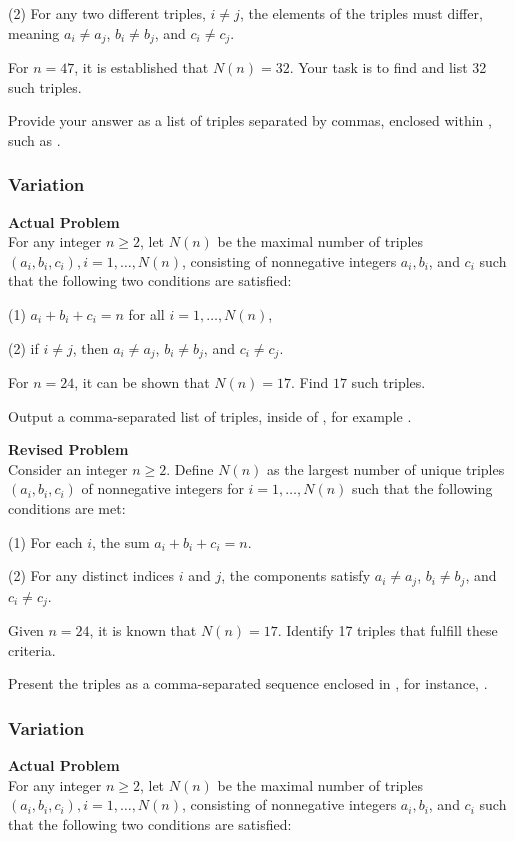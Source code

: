 (2) For any two different triples, \( i \neq j \), the elements of the triples must differ, meaning \( a_i \neq a_j \), \( b_i \neq b_j \), and \( c_i \neq c_j \).

For \( n = 47 \), it is established that \( N(n) = 32 \). Your task is to find and list 32 such triples.

Provide your answer as a list of triples separated by commas, enclosed within \boxed, such as .

\subsubsection{Variation}
\textbf{Actual Problem}\\
For any integer $n \geq 2$, let $N(n)$ be the maximal number of triples $(a_i, b_i, c_i), i=1,\ldots,N(n)$, consisting of nonnegative integers $a_i, b_i$, and $c_i$ such that the following two conditions are satisfied:

(1) $a_i+b_i+c_i=n$ for all $i=1,\ldots,N(n)$,

(2) if $i \neq j$, then $a_i \neq a_j$, $b_i \neq b_j$, and $c_i \neq c_j$.

For $n = 24$, it can be shown that $N(n)=17$. Find $17$ such triples.


Output a comma-separated list of triples, inside of \boxed, for example .

\textbf{Revised Problem}\\
Consider an integer \(n \geq 2\). Define \(N(n)\) as the largest number of unique triples \((a_i, b_i, c_i)\) of nonnegative integers for \(i = 1, \ldots, N(n)\) such that the following conditions are met:

(1) For each \(i\), the sum \(a_i + b_i + c_i = n\).

(2) For any distinct indices \(i\) and \(j\), the components satisfy \(a_i \neq a_j\), \(b_i \neq b_j\), and \(c_i \neq c_j\).

Given \(n = 24\), it is known that \(N(n) = 17\). Identify 17 triples that fulfill these criteria.

Present the triples as a comma-separated sequence enclosed in \boxed, for instance, .

\subsubsection{Variation}
\textbf{Actual Problem}\\
For any integer $n \geq 2$, let $N(n)$ be the maximal number of triples $(a_i, b_i, c_i), i=1,\ldots,N(n)$, consisting of nonnegative integers $a_i, b_i$, and $c_i$ such that the following two conditions are satisfied:

